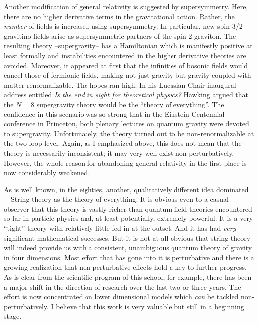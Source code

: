 Another modification of general relativity is suggested by supersymmetry.
Here, there are no higher derivative terms in the gravitational action. Rather,
the {\it number} of fields is increased using supersymmetry. In particular,
new spin 3/2 gravitino fields arise as supersymmetric partners of the spin 2
graviton. The resulting theory --supergravity-- has a Hamiltonian which is
manifestly positive at least formally and instabilities encountered in the
higher derivative theories are avoided. Moreover, it appeared at first
that the infinities of bosonic fields would cancel those of
fermionic fields, making not just gravity but gravity coupled with matter
renormalizable. The hopes ran high. In his Lucasian Chair inaugural
address entitled {\it Is the end in sight for theoretical physics?} Hawking
argued that the $N=8$ supergravity theory would be the ``theory of
everything''. The confidence in this scenario was so strong that in the
Einstein Centennial conference in Princeton, both plenary lectures on quantum
gravity were devoted to supergravity. Unfortunately, the theory turned out
to be non-renormalizable at the two loop level. Again, as I emphasized above,
this does not mean that the theory is necessarily inconsistent; it may
very well exist non-perturbatively. However, the whole reason for
abandoning general relativity in the first place is now considerably weakened.

As is well known, in the eighties, another, qualitatively different idea
dominated ---String theory as the theory of everything. It is obvious even
to a casual observer that this theory is vastly richer than quantum field
theories encountered so far in particle physics and, at least potentially,
extremely powerful. It is a very ``tight'' theory with relatively little fed
in at the outset. And it has had {\it very} significant mathematical successes.
But it is not at all obvious that string theory will indeed provide us with a
consistent, unambiguous quantum theory of gravity in four dimensions. Most
effort that has gone into it is perturbative and there is a growing
realization that non-perturbative effects hold a key to further progress. As
is clear from the scientific program of this school, for example, there has
been a major shift in the direction of research over the last two or three
years. The effort is now concentrated on lower dimensional models which
{\it can} be tackled non-perturbatively. I believe that this work is very
valuable but still in a beginning stage.

